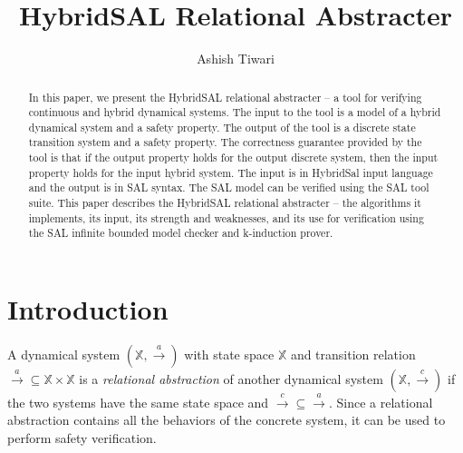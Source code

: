 \documentclass{llncs}
\title{HybridSAL Relational Abstracter}
\author{Ashish Tiwari}
\institute{SRI International, Menlo Park, CA.\ \url{ashish.tiwari@sri.com}}
\begin{document}
\maketitle

\begin{abstract}
  In this paper, we present the HybridSAL relational abstracter -- 
  a tool for verifying continuous and hybrid dynamical
  systems.  The input to the tool is a model of a hybrid dynamical
  system and a safety property.  The output of the tool is a discrete
  state transition system and a safety property.  The correctness
  guarantee provided by the tool is that if the output property 
  holds for the output discrete system, then the input property
  holds for the input hybrid system.  The input is in HybridSal
  input language and the output is in SAL syntax. The SAL model
  can be verified using the SAL tool suite.  This paper describes 
  the HybridSAL relational abstracter -- the algorithms it implements, 
  its input, its strength and weaknesses, and its use for verification
  using the SAL infinite bounded model checker and k-induction prover.
\end{abstract}

\def\XX{\mathbb{X}}
\def\QQ{\mathbb{Q}}
\def\YY{\mathbb{Y}}
\def\RR{\mathbb{R}}
\def\ra{\rightarrow}
\def\bra{{\stackrel{a}{\ra}}}  %
\def\rra{{\stackrel{c}{\ra}}}  %

\section{Introduction}

A dynamical system $(\XX, \bra)$  with state space $\XX$ and
transition relation $\bra\subseteq \XX\times \XX$ 
is a {\em{relational abstraction}} of another 
dynamical system $(\XX, \rra)$ if
the two systems have the same state space and
$\rra \subseteq \bra$.
Since a relational abstraction contains all the behaviors of the
concrete system, it can be used to perform safety verification.
\end{document}
